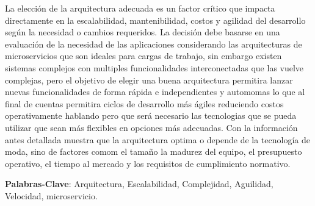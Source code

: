 \documentclass[
	article,			%
	11pt,				%
	oneside,			%
	a4paper,			%
	english,			%
	brazil,				%
	sumario=tradicional
	]{abntex2}
\begin{document}
\frenchspacing 


%
%
\maketitle

\begin{columnaderesumen}
La elección de la arquitectura adecuada es un factor crítico que impacta directamente en la escalabilidad, mantenibilidad, costos y agilidad del desarrollo según la necesidad o cambios requeridos.
La decisión debe basarse en una evaluación de la necesidad de las aplicaciones considerando las arquitecturas de microservicios que son ideales para cargas de trabajo, sin embargo existen sistemas complejos con multiples funcionalidades interconectadas que las vuelve complejas, pero el objetivo de elegir una buena arquitectura permitira lanzar nuevas funcionalidades de forma rápida e independientes y automomas lo que al final de cuentas permitira ciclos de desarrollo más ágiles reduciendo costos operativamente hablando pero que será necesario las tecnologias que se pueda utilizar que sean más flexibles en opciones más adecuadas.
Con la información antes detallada muestra que la arquitectura optima o depende de la tecnología de moda, sino de factores comom el tamaño  la madurez del equipo, el presupuesto operativo, el tiempo al mercado y los requisitos de cumplimiento normativo.

 
 \vspace{\onelineskip}
 
 \noindent
 \textbf{Palabras-Clave}: Arquitectura, Escalabilidad, Complejidad, Aguilidad, Velocidad, microservicio.
\end{columnaderesumen}


\textual

\end{document}
